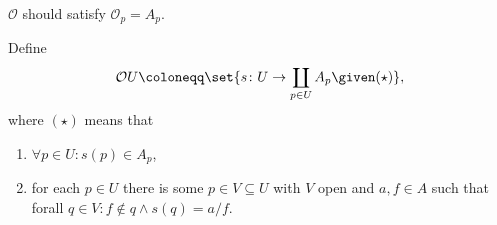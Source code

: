 $\mathcal{O}$ should satisfy $\mathcal{O}_p = A_p$.

Define
\[ \mathcal{O}U \coloneqq\set{s\colon U\to\coprod_{p \in U} A_p\given (\star)}, \]
where $(\star)$ means that
\begin{enumerate}
	\item $\forall p \in U\colon s(p) \in A_p$,
	\item for each $p \in U$ there is some $p \in V \subseteq U$ with $V$ open and
		$a, f \in A$ such that forall $q \in V\colon f\notin q\wedge s(q) = a/f$.
\end{enumerate}
